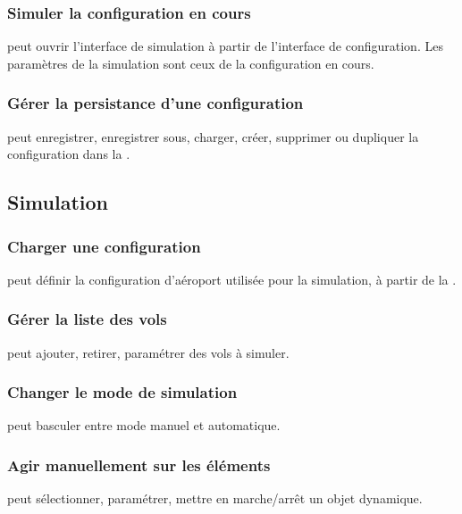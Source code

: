 \subsubsection{Simuler la configuration en cours}
 peut ouvrir l'interface de simulation à partir de l'interface de configuration. Les paramètres de la simulation sont ceux de la configuration en cours.

\subsubsection{Gérer la persistance d'une configuration}
 peut enregistrer, enregistrer sous, charger, créer, supprimer ou dupliquer la configuration dans la .

\subsection{Simulation}

\subsubsection{Charger une configuration} 
 peut définir la configuration d'aéroport utilisée pour la simulation, à partir de la .

\subsubsection{Gérer la liste des vols}
 peut ajouter, retirer, paramétrer des vols à simuler.

\subsubsection{Changer le mode de simulation}
 peut basculer entre mode manuel et automatique.

\subsubsection{Agir manuellement sur les éléments}
 peut sélectionner, paramétrer, mettre en marche/arrêt un objet dynamique.

